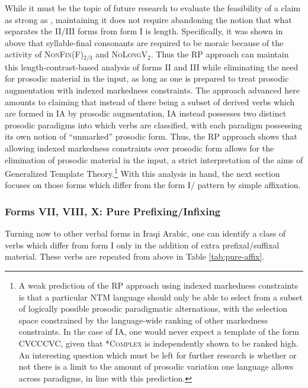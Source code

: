 \documentclass[12pt,twoside,letterpaper]{article}
\begin{document}
While it must be the topic of future research to evaluate the feasibility of a claim as strong as \Last, maintaining it does not require abandoning the notion that what separates the II/III forms from form I is length. Specifically, it was shown in above that syllable-final consonants are required to be moraic because of the activity of \textsc{NonFin}(F)$_{2/3}$ and \textsc{NoLongV}$_2$. Thus the RP approach can maintain this length-contrast-based analysis of forms II and III while eliminating the need for prosodic material in the input, as long as one is prepared to treat prosodic augmentation with indexed markedness constraints. The approach advanced here amounts to claiming that instead of there being a subset of derived verbs which are formed in IA by prosodic augmentation, IA instead possesses two distinct prosodic paradigms into which verbs are classified, with each paradigm possessing its own notion of ``unmarked'' prosodic form. Thus, the RP approach shows that allowing indexed markedness constraints over prosodic form allows for the elimination of prosodic material in the input, a strict interpretation of the aims of Generalized Template Theory.\footnote{A weak prediction of the RP approach using indexed markedness constraints is that a particular NTM language should only be able to select from a subset of logically possible prosodic paradigmatic alternations, with the selection space constrained by the language-wide ranking of other markedness constraints. In the case of IA, one would never expect a template of the form CVCCCVC, given that *\textsc{Complex} is independently shown to be ranked high. An interesting question which must be left for further research is whether or not there is a limit to the amount of prosodic variation one language allows across paradigms, in line with this prediction.}  With this analysis in hand, the next section focuses on those forms which differ from the form I/{\em {}} pattern by simple affixation.


\subsubsection{Forms VII, VIII, X: Pure Prefixing/Infixing}
\label{sec:forms-vii-viii-x}

Turning now to other verbal forms in Iraqi Arabic, one can identify a class of verbs which differ from form I only in the addition of extra prefixal/suffixal material. These verbs are repeated from above in Table \ref{tab:pure-affix}.
\end{document}
